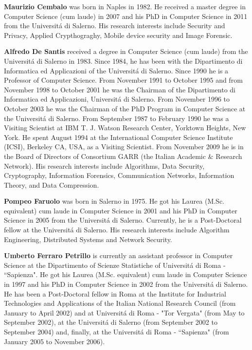 \documentclass[authoryear]{elsarticle}
\begin{document}
\medskip
\textbf{Maurizio Cembalo} was born in Naples in 1982. He received a master degree in Computer Science (cum laude) in 2007 and his PhD in Computer Science in 2011 from the Universit\'{a} di Salerno. His research interests include Security and Privacy, Applied Crypthograghy, Mobile device security and Image Forensic.


\medskip

\textbf{Alfredo De Santis} received a degree in Computer Science (cum laude) from the Universit\'{a} di Salerno in 1983. Since 1984, he has been with the Dipartimento di Informatica ed Applicazioni of the Universit\'{a} di Salerno. Since 1990 he is a Professor of Computer Science. From November 1991 to October 1995 and from November 1998 to October 2001 he was the Chairman of the Dipartimento di Informatica ed Applicazioni, Universit\'{a} di Salerno. From November 1996 to October 2003 he was the Chairman of the PhD Program in Computer Science at the Universit\'{a} di Salerno. From September 1987 to February 1990 he was a Visiting Scientist at IBM T. J. Watson Research Center, Yorktown Heights, New York. He spent August 1994 at the International Computer Science Institute (ICSI), Berkeley CA, USA, as a Visiting Scientist. From November 2009 he is in the Board of Directors of Consortium GARR (the Italian Academic \& Research Network). His research interests include Algorithms, Data Security, Cryptography, Information Forensics, Communication Networks, Information Theory, and Data Compression.

\medskip

\textbf{Pompeo Faruolo} was born in Salerno in 1975. He got his Laurea
(M.Sc. equivalent) cum laude in Computer Science in 2001 and his PhD
in Computer Science in 2005 from the Universit\'{a} di Salerno. Currently,
he is a Post-Doctoral fellow at the Universit\'{a} di Salerno. His
research interests include Algorithm Engineering, Distributed Systems
and Network Security.

\medskip

\textbf{Umberto Ferraro Petrillo} is currently an assistant professor
in Computer Science at the Dipartimento of Scienze
Statistiche of Universit\'{a} di Roma - ``Sapienza". He got his Laurea (M.Sc. equivalent) cum laude in
Computer Science in 1997 and his PhD in Computer Science in 2002 from
the Universit\'{a} di Salerno. He has been a Post-Doctoral fellow in Roma
at the Institute for Industrial Technologies and Applications of the
Italian National Research Council (from January to April 2002) and at
Universit\'{a} di Roma - "Tor Vergata" (from May to September 2002), at the
Universit\'{a} di Salerno (from September 2002 to September 2004) and, finally, at
the Universit\'{a} di Roma - ``Sapienza" (from January 2005 to November 2006).
\end{document}

